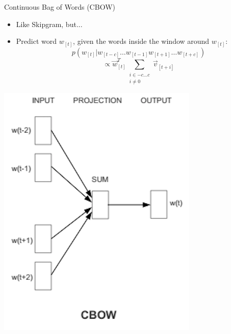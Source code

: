 \begin{vbframe}{Continuous Bag of Words (CBOW)}

\vfill

\begin{minipage}{.58\textwidth}
\begin{itemize}
	\item Like Skipgram, but...
	\item Predict word $w_{[t]}$, given the words inside the window around $w_{[t]}$:
	 $$p(w_{[t]}|w_{[t-c]} \ldots w_{[t-1]} w_{[t+1]} \ldots w_{[t+c]})$$
	 $$\propto \vec w_{[t]}^T \sum_{\substack{i \in {-c\ldots c} \\ i \neq 0}} \vec v_{[t+i]}$$
\end{itemize}
\end{minipage}
\begin{minipage}{.41\textwidth}
\begin{center}
\includegraphics[scale=0.99]{figure/cbow}
\end{center}
\end{minipage}

\vfill

\end{vbframe}


